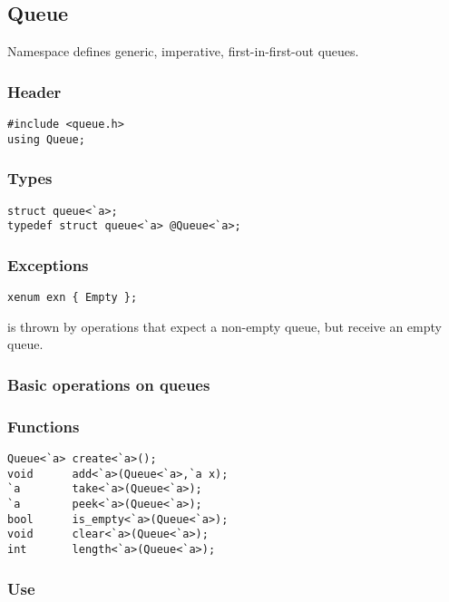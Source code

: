 \subsection{Queue}

Namespace  defines generic, imperative, first-in-first-out
queues.

\subsubsection*{Header}
\begin{verbatim}
#include <queue.h>
using Queue;
\end{verbatim}

\subsubsection*{Types}
\begin{verbatim}
struct queue<`a>;
typedef struct queue<`a> @Queue<`a>;
\end{verbatim}

\subsubsection*{Exceptions}
\begin{verbatim}
xenum exn { Empty };
\end{verbatim}

 is thrown by operations that expect a non-empty queue, but
receive an empty queue.

\subsubsection*{Basic operations on queues}
\subsubsection*{Functions}
\begin{verbatim}
Queue<`a> create<`a>();
void      add<`a>(Queue<`a>,`a x);
`a        take<`a>(Queue<`a>);
`a        peek<`a>(Queue<`a>);
bool      is_empty<`a>(Queue<`a>);
void      clear<`a>(Queue<`a>);
int       length<`a>(Queue<`a>);  
\end{verbatim}

\subsubsection*{Use}

